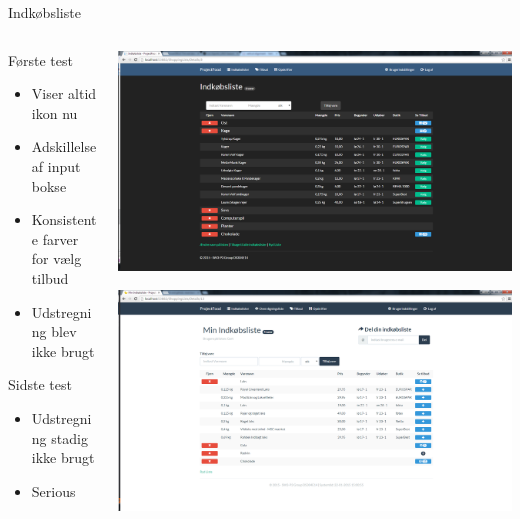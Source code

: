 \begin{frame}{Indkøbsliste}
	
	\begin{minipage}[0.3\textheight]{\textwidth}
	\begin{columns}[T]
	\begin{column}{0.5\textwidth}
	 
	 Første test
	 \begin{itemize}
	 	\item Viser altid ikon nu
	 	\item Adskillelse af input bokse
	 	\item Konsistente farver for vælg tilbud
	 	\item Udstregning blev ikke brugt
	 \end{itemize}
	 Sidste test
	 \begin{itemize}
	 	\item Udstregning stadig ikke brugt
	 	\item Serious
	 \end{itemize}
	 
	\end{column}
	\begin{column}{0.5\textwidth}
	 \includegraphics[width=1\textwidth,height=1\textheight,keepaspectratio, trim={1cm 0 0 16mm}, clip]{images/Screenshots/ShoppingListOffersOld.png}
	 
	 \vspace{2 mm}
	  
	  \includegraphics[width=1\textwidth,height=1\textheight,keepaspectratio, trim={1cm 0 0 16mm}, clip]{images/Screenshots/ShoppingList.png}
	\end{column}
	\end{columns}
	

  \end{minipage}
	
\end{frame}
